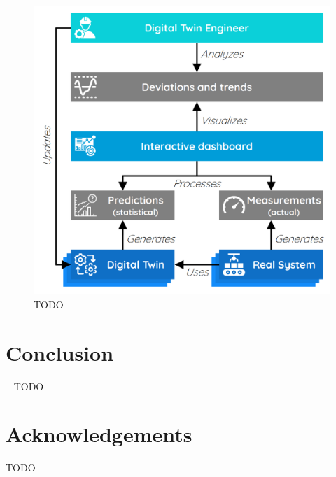 \documentclass[9pt,conference]{IEEEtran}
\begin{document}
    \begin{figure}[htbp]
        \includegraphics[width=\columnwidth]{Continuous Quality Control.png}
        \caption{TODO}
        \label{todo-3}
    \end{figure}

   

    \section{Conclusion}~\label{section:conclusion}
    TODO

    \section*{Acknowledgements}
    TODO

    
    
\end{document}
